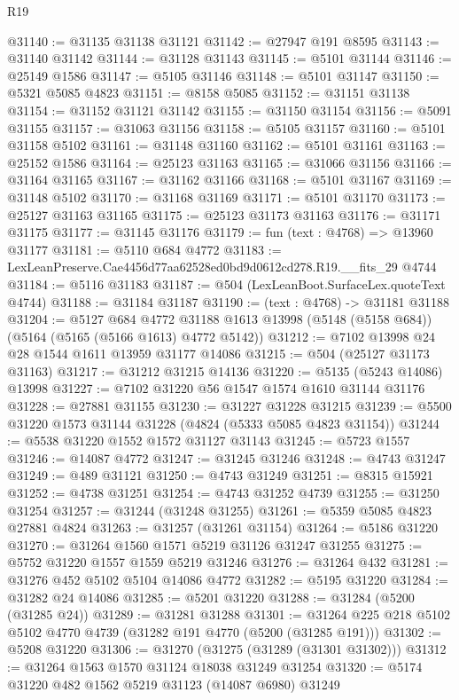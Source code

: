 \begin{lexlean}{R19}
\begin{coremodule}
{{{{{{{{{{{@31140 := @31135 @31138 @31121
@31142 := @27947 @191 @8595
@31143 := @31140 @31142
@31144 := @31128 @31143
@31145 := @5101 @31144
@31146 := @25149 @1586
@31147 := @5105 @31146
@31148 := @5101 @31147
@31150 := @5321 @5085 @4823
@31151 := @8158 @5085
@31152 := @31151 @31138
@31154 := @31152 @31121 @31142
@31155 := @31150 @31154
@31156 := @5091 @31155
@31157 := @31063 @31156
@31158 := @5105 @31157
@31160 := @5101 @31158 @5102
@31161 := @31148 @31160
@31162 := @5101 @31161
@31163 := @25152 @1586
@31164 := @25123 @31163
@31165 := @31066 @31156
@31166 := @31164 @31165
@31167 := @31162 @31166
@31168 := @5101 @31167
@31169 := @31148 @5102
@31170 := @31168 @31169
@31171 := @5101 @31170
@31173 := @25127 @31163 @31165
@31175 := @25123 @31173 @31163
@31176 := @31171 @31175
@31177 := @31145 @31176
@31179 := fun (text : @4768) => @13960 @31177
@31181 := @5110 @684 @4772
@31183 := LexLeanPreserve.Cae4456d77aa62528ed0bd9d0612cd278.R19.__fits_29 @4744
@31184 := @5116 @31183
@31187 := @504 (LexLeanBoot.SurfaceLex.quoteText @4744)
@31188 := @31184 @31187
@31190 := (text : @4768) -> @31181 @31188
@31204 := @5127
    @684
    @4772
    @31188
    @1613
    @13998
    (@5148 (@5158 @684))
    (@5164 (@5165 (@5166 @1613) @4772 @5142))
@31212 := @7102 @13998 @24 @28 @1544 @1611 @13959 @31177 @14086
@31215 := @504 (@25127 @31173 @31163)
@31217 := @31212 @31215 @14136
@31220 := @5135 (@5243 @14086) @13998
@31227 := @7102 @31220 @56 @1547 @1574 @1610 @31144 @31176
@31228 := @27881 @31155
@31230 := @31227 @31228 @31215
@31239 := @5500 @31220 @1573 @31144 @31228 (@4824 (@5333 @5085 @4823 @31154))
@31244 := @5538 @31220 @1552 @1572 @31127 @31143
@31245 := @5723 @1557
@31246 := @14087 @4772
@31247 := @31245 @31246
@31248 := @4743 @31247
@31249 := @489 @31121
@31250 := @4743 @31249
@31251 := @8315 @15921
@31252 := @4738 @31251
@31254 := @4743 @31252 @4739
@31255 := @31250 @31254
@31257 := @31244 (@31248 @31255)
@31261 := @5359 @5085 @4823 @27881 @4824
@31263 := @31257 (@31261 @31154)
@31264 := @5186 @31220
@31270 := @31264 @1560 @1571 @5219 @31126 @31247 @31255
@31275 := @5752 @31220 @1557 @1559 @5219 @31246
@31276 := @31264 @432
@31281 := @31276 @452 @5102 @5104 @14086 @4772
@31282 := @5195 @31220
@31284 := @31282 @24 @14086
@31285 := @5201 @31220
@31288 := @31284 (@5200 (@31285 @24))
@31289 := @31281 @31288
@31301 := @31264 @225 @218 @5102 @5102 @4770 @4739 (@31282 @191 @4770 (@5200 (@31285 @191)))
@31302 := @5208 @31220
@31306 := @31270 (@31275 (@31289 (@31301 @31302)))
@31312 := @31264 @1563 @1570 @31124 @18038 @31249 @31254
@31320 := @5174 @31220 @482 @1562 @5219 @31123 (@14087 @6980) @31249
}}}}}}}}}}}
\end{coremodule}
\end{lexlean}

